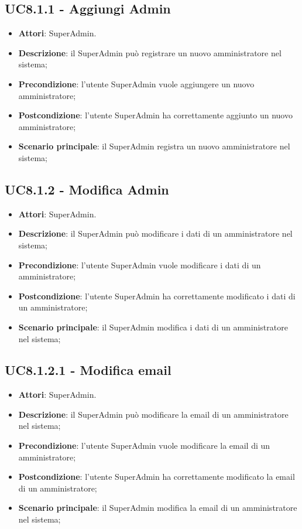 \documentclass[../AnalisiDeiRequisiti_v3.0.0.tex]{subfiles}
\begin{document}
\subsection{UC8.1.1 - Aggiungi Admin} 
\label{sssec:UC8.1.1} 
\begin{itemize} 
\item \textbf{Attori}: SuperAdmin.
\item \textbf{Descrizione}: il SuperAdmin può registrare un nuovo amministratore nel sistema;
\item \textbf{Precondizione}: l'utente SuperAdmin vuole aggiungere un nuovo amministratore;
\item \textbf{Postcondizione}: l'utente SuperAdmin ha correttamente  aggiunto un nuovo amministratore;
\item \textbf{Scenario principale}: il SuperAdmin registra un nuovo amministratore nel sistema;
\end{itemize} 
\subsection{UC8.1.2 - Modifica Admin} 
\label{sssec:UC8.1.2} 
\begin{itemize} 
\item \textbf{Attori}: SuperAdmin.
\item \textbf{Descrizione}: il SuperAdmin può modificare i dati di un amministratore nel sistema;
\item \textbf{Precondizione}: l'utente SuperAdmin vuole modificare i dati di un amministratore;
\item \textbf{Postcondizione}: l'utente SuperAdmin ha correttamente  modificato i dati di un amministratore;
\item \textbf{Scenario principale}: il SuperAdmin modifica i dati di un amministratore nel sistema;
\end{itemize} 
\subsection{UC8.1.2.1 - Modifica email} 
\label{sssec:UC8.1.2.1} 
\begin{itemize} 
\item \textbf{Attori}: SuperAdmin.
\item \textbf{Descrizione}: il SuperAdmin può modificare la email di un amministratore nel sistema;
\item \textbf{Precondizione}: l'utente SuperAdmin vuole modificare la email di un amministratore;
\item \textbf{Postcondizione}: l'utente SuperAdmin ha correttamente  modificato la email di un amministratore;
\item \textbf{Scenario principale}: il SuperAdmin modifica la email di un amministratore nel sistema;
\end{itemize} 
\end{document}
